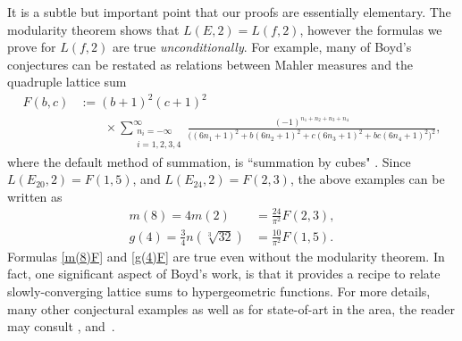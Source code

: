 \documentclass[12pt,reqno]{amsart}
\theoremstyle{remark}
\begin{document}
It is a subtle but important point that our proofs are essentially
elementary.  The modularity theorem shows that $L(E,2)=L(f,2)$,
however the formulas we prove for $L(f,2)$ are true
\emph{unconditionally}. For example, many of Boyd's conjectures
can be restated as relations between Mahler measures and the
quadruple lattice sum~\cite{Rgsubmit}
\begin{equation}
\begin{split}
F(b,c)&:=(b+1)^2(c+1)^2
\\ &\qquad
\times\sum_{\substack{n_i=-\infty\\i=1,2,3,4}}^{\infty}
\frac{(-1)^{n_1+n_2+n_3+n_4}}{\bigl((6n_1+1)^2+b(6n_2+1)^2+c(6n_3+1)^2+bc(6n_4+1)^2\bigr)^2},
\end{split}
\label{F(b,c)}
\end{equation}
where the default method of summation, is ``summation by cubes"
\cite{Bor}.  Since $L(E_{20},2)=F(1,5)$, and $L(E_{24},2)=F(2,3)$,
the above examples can be written as
\begin{align}
m(8)=4m(2)&=\frac{24}{\pi^2}F(2,3),
\label{m(8)F}
\\
g(4)=\frac34n(\sqrt[3]{32})
&=\frac{10}{\pi^2}F(1,5).
\label{g(4)F}
\end{align}
Formulas \eqref{m(8)F} and \eqref{g(4)F} are true even without the
modularity theorem.  In fact, one significant aspect of Boyd's
work, is that it provides a recipe to relate slowly-converging
lattice sums to hypergeometric functions. For more details, many
other conjectural examples as well as for state-of-art in the
area, the reader may consult \cite{Bo1}, \cite{RV}
and~\cite{Rgsubmit}.
\end{document}
